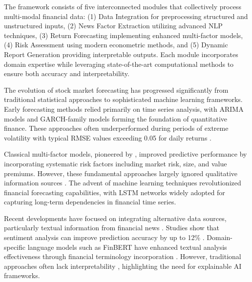 \documentclass[3p,times,procedia]{elsarticle}
\begin{document}
The framework consists of five interconnected modules that collectively process multi-modal financial data: (1) Data Integration for preprocessing structured and unstructured inputs, (2) News Factor Extraction utilizing advanced NLP techniques, (3) Return Forecasting implementing enhanced multi-factor models, (4) Risk Assessment using modern econometric methods, and (5) Dynamic Report Generation providing interpretable outputs. Each module incorporates domain expertise while leveraging state-of-the-art computational methods to ensure both accuracy and interpretability.

The evolution of stock market forecasting has progressed significantly from traditional statistical approaches to sophisticated machine learning frameworks. Early forecasting methods relied primarily on time series analysis, with ARIMA models \cite{Box1970} and GARCH-family models \cite{Engle1982,Bollerslev1986} forming the foundation of quantitative finance. These approaches often underperformed during periods of extreme volatility with typical RMSE values exceeding 0.05 for daily returns \cite{Poon2003}.

Classical multi-factor models, pioneered by \cite{FAMA1993}, improved predictive performance by incorporating systematic risk factors including market risk, size, and value premiums. However, these fundamental approaches largely ignored qualitative information sources \cite{Malkiel2003,Chen2015}. The advent of machine learning techniques revolutionized financial forecasting capabilities, with LSTM networks \cite{Fischer2018,Bao2017} widely adopted for capturing long-term dependencies in financial time series.

Recent developments have focused on integrating alternative data sources, particularly textual information from financial news \cite{Schumaker2009,Xing2018,TETLOCK2007}. Studies show that sentiment analysis can improve prediction accuracy by up to 12\% \cite{Ding2015}. Domain-specific language models such as FinBERT \cite{Araci2019} have enhanced textual analysis effectiveness through financial terminology incorporation \cite{Loughran2011}. However, traditional approaches often lack interpretability \cite{Ribeiro2016}, highlighting the need for explainable AI frameworks.
\end{document}
